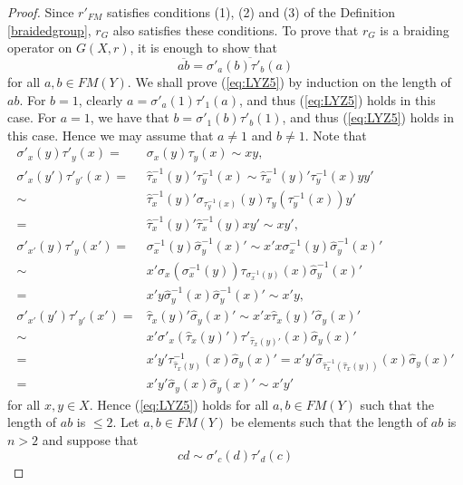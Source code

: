 \begin{proof}
Since $r'_{FM}$ satisfies conditions (1), (2) and (3) of the Definition \ref{braidedgroup}, $r_G$ also satisfies these conditions.  To prove that $r_G$ is a braiding operator on $G(X,r)$, it is enough to show that
\begin{equation}\label{eq:LYZ5}\overline{ab}=\overline{\sigma'_a(b)\tau'_b(a)}\end{equation}
for all $a,b\in FM(Y)$. 
We shall prove (\ref{eq:LYZ5}) by induction on the length of $ab$. For $b=1$, clearly $a=\sigma'_a(1)\tau'_1(a)$, and thus (\ref{eq:LYZ5}) holds in this case. For $a=1$, we have that $b=\sigma'_1(b)\tau'_b(1)$, and thus (\ref{eq:LYZ5}) holds in this case. Hence we may assume that $a\neq 1$ and $b\neq 1$. Note that
\begin{align*}
    \sigma'_x(y)\tau'_y(x)=& \sigma_x(y)\tau_y(x)\sim xy,\\
    \sigma'_x(y')\tau'_{y'}(x)=& \widehat{\tau}^{-1}_x(y)'\tau^{-1}_y(x)
    \sim  \widehat{\tau}^{-1}_x(y)'\tau^{-1}_y(x)yy'\\
    \sim & \widehat{\tau}^{-1}_x(y)'\sigma_{\tau^{-1}_y(x)}(y)\tau_y(\tau^{-1}_y(x))y'\\
    =& \widehat{\tau}^{-1}_x(y)'\widehat{\tau}^{-1}_x(y)xy'
    \sim xy',\\
    \sigma'_{x'}(y)\tau'_{y}(x')=& \sigma^{-1}_x(y)\widehat{\sigma}^{-1}_y(x)'
    \sim  x'x\sigma^{-1}_x(y)\widehat{\sigma}^{-1}_y(x)'\\
    \sim & x'\sigma_x(\sigma^{-1}_x(y))\tau_{\sigma^{-1}_x(y)}(x)\widehat{\sigma}^{-1}_y(x)'\\
    =& x'y\widehat{\sigma}^{-1}_y(x)\widehat{\sigma}^{-1}_y(x)'
    \sim x'y,\\
    \sigma'_{x'}(y')\tau'_{y'}(x')=& \widehat{\tau}_x(y)'\widehat{\sigma}_y(x)'
    \sim  x'x\widehat{\tau}_x(y)'\widehat{\sigma}_y(x)'\\
    \sim & x'\sigma'_x(\widehat{\tau}_x(y)')\tau'_{\widehat{\tau}_x(y)'}(x)\widehat{\sigma}_y(x)'\\
    =& x'y'\tau^{-1}_{\widehat{\tau}_x(y)}(x)\widehat{\sigma}_y(x)'=x'y'\widehat{\sigma}_{\widehat{\tau}^{-1}_x(\widehat{\tau}_x(y))}(x)\widehat{\sigma}_y(x)'\\
    = &x'y'\widehat{\sigma}_{y}(x)\widehat{\sigma}_y(x)'
    \sim x'y'
    \end{align*}
for all $x,y\in X$. Hence (\ref{eq:LYZ5}) holds for all $a,b\in FM(Y)$ such that the length of $ab$ is $\leq 2$. Let $a,b\in FM(Y)$ be elements such that the length of $ab$ is $n>2$ and suppose that
\[cd\sim \sigma'_c(d)\tau'_d(c)\] 

\end{proof}
